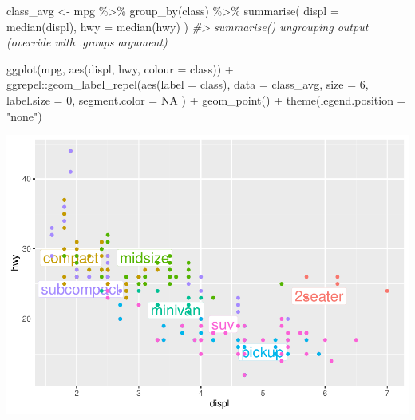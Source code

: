\documentclass[
]{article}
\newenvironment{Shaded}{\begin{snugshade}}{\end{snugshade}}
\newcommand{\AttributeTok}[1]{\textcolor[rgb]{0.77,0.63,0.00}{#1}}
\newcommand{\CommentTok}[1]{\textcolor[rgb]{0.56,0.35,0.01}{\textit{#1}}}
\newcommand{\ConstantTok}[1]{\textcolor[rgb]{0.00,0.00,0.00}{#1}}
\newcommand{\DecValTok}[1]{\textcolor[rgb]{0.00,0.00,0.81}{#1}}
\newcommand{\FunctionTok}[1]{\textcolor[rgb]{0.00,0.00,0.00}{#1}}
\newcommand{\NormalTok}[1]{#1}
\newcommand{\OtherTok}[1]{\textcolor[rgb]{0.56,0.35,0.01}{#1}}
\newcommand{\SpecialCharTok}[1]{\textcolor[rgb]{0.00,0.00,0.00}{#1}}
\newcommand{\StringTok}[1]{\textcolor[rgb]{0.31,0.60,0.02}{#1}}
\begin{document}
\begin{Shaded}
\begin{Highlighting}[]
\NormalTok{class\_avg }\OtherTok{\textless{}{-}}\NormalTok{ mpg }\SpecialCharTok{\%\textgreater{}\%}
  \FunctionTok{group\_by}\NormalTok{(class) }\SpecialCharTok{\%\textgreater{}\%}
  \FunctionTok{summarise}\NormalTok{(}
    \AttributeTok{displ =} \FunctionTok{median}\NormalTok{(displ),}
    \AttributeTok{hwy =} \FunctionTok{median}\NormalTok{(hwy)}
\NormalTok{  )}
\CommentTok{\#\textgreater{} \textasciigrave{}summarise()\textasciigrave{} ungrouping output (override with \textasciigrave{}.groups\textasciigrave{} argument)}

\FunctionTok{ggplot}\NormalTok{(mpg, }\FunctionTok{aes}\NormalTok{(displ, hwy, }\AttributeTok{colour =}\NormalTok{ class)) }\SpecialCharTok{+}
\NormalTok{  ggrepel}\SpecialCharTok{::}\FunctionTok{geom\_label\_repel}\NormalTok{(}\FunctionTok{aes}\NormalTok{(}\AttributeTok{label =}\NormalTok{ class),}
    \AttributeTok{data =}\NormalTok{ class\_avg,}
    \AttributeTok{size =} \DecValTok{6}\NormalTok{,}
    \AttributeTok{label.size =} \DecValTok{0}\NormalTok{,}
    \AttributeTok{segment.color =} \ConstantTok{NA}
\NormalTok{  ) }\SpecialCharTok{+}
  \FunctionTok{geom\_point}\NormalTok{() }\SpecialCharTok{+}
  \FunctionTok{theme}\NormalTok{(}\AttributeTok{legend.position =} \StringTok{"none"}\NormalTok{)}
\end{Highlighting}
\end{Shaded}

\includegraphics{Journal_files/figure-latex/unnamed-chunk-53-1.pdf}
\end{document}
